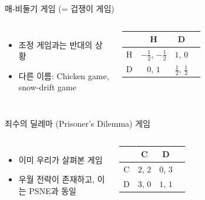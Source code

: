 \documentclass[final]{beamer}
\begin{document}
\begin{frame}[t]{매-비둘기 게임 (= 겁쟁이 게임)}
	\begin{columns}[c]
	\column{18em}
	\begin{itemize}
		\item 조정 게임과는 반대의 상황  
		\item 다른 이름: Chicken game, snow-drift game 
	\end{itemize}
	\column{15em}
	\begin{table}
	\setlength{\tabcolsep}{1.2em}
	\begin{tabular}{|c|c|c|c|} \hline
	& {H} &  {D}\\ \hline
	{H} & {$-\frac{1}{2}$}, {$-\frac{1}{2}$} & {$1$}, {$0$} \\ \hline%
	{D} & {$0$}, {$1$}  & {$\frac{1}{2}$}, {$\frac{1}{2}$}\\ 
	\hline
	\end{tabular}
	\end{table}
	\end{columns}
\end{frame}

\begin{frame}[t]{죄수의 딜레마 (Prisoner's Dilemma) 게임}
	\begin{columns}[c]
	\column{18em}
	\begin{itemize}
		\item 이미 우리가 살펴본 게임 
		\item 우월 전략이 존재하고, 이는 PSNE과 동일  
	\end{itemize}
	\column{15em}
	\begin{table}
	\setlength{\tabcolsep}{1.2em}
	\begin{tabular}{|c|c|c|c|} \hline
	& {C} &  {D}\\ \hline
	{C} & {$2$}, {$2$} & {$0$}, {$3$} \\ \hline%
	{D} & {$3$}, {$0$}  & {$1$}, {$1$}\\ 
	\hline
	\end{tabular}
	\end{table}
	\end{columns}
\end{frame}
\end{document}
